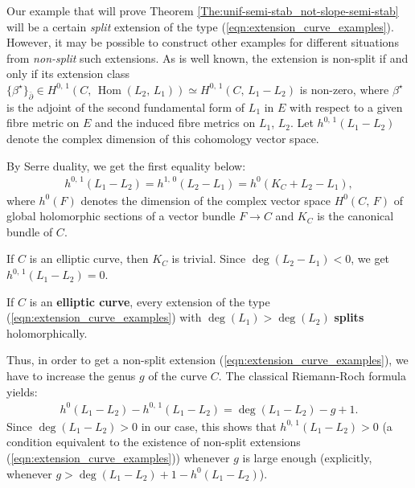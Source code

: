 \documentclass[12pt]{article}
\begin{document}
\vspace{2ex}

Our example that will prove Theorem \ref{The:unif-semi-stab_not-slope-semi-stab} will be a certain {\it split} extension of the type (\ref{eqn:extension_curve_examples}). However, it may be possible to construct other examples for different situations from {\it non-split} such extensions. As is well known, the extension is non-split if and only if its extension class $\{\beta^\star\}_{\bar\partial}\in H^{0,\,1}(C,\,\operatorname{Hom}(L_2,\,L_1))\simeq H^{0,\,1}(C,\, L_1-L_2)$ is non-zero, where $\beta^\star$ is the adjoint of the second fundamental form of $L_1$ in $E$ with respect to a given fibre metric on $E$ and the induced fibre metrics on $L_1$, $L_2$. Let $h^{0,\,1}(L_1-L_2)$ denote the complex dimension of this cohomology vector space.

By Serre duality, we get the first equality below: \begin{eqnarray*}h^{0,\,1}(L_1-L_2) = h^{1,\,0}(L_2-L_1) = h^0(K_C + L_2-L_1),\end{eqnarray*} where $h^0(F)$ denotes the dimension of the complex vector space $H^0(C,\,F)$ of global holomorphic sections of a vector bundle $F\to C$ and $K_C$ is the canonical bundle of $C$.

If $C$ is an elliptic curve, then $K_C$ is trivial. Since $\deg (L_2-L_1)<0$, we get $h^{0,\,1}(L_1-L_2) = 0$.

\begin{Conc}\label{Conc:elliptic-curve_solit-extension} If $C$ is an {\bf elliptic curve}, every extension of the type (\ref{eqn:extension_curve_examples}) with $\deg (L_1)> \deg (L_2)$ {\bf splits} holomorphically.


\end{Conc}


Thus, in order to get a non-split extension (\ref{eqn:extension_curve_examples}), we have to increase the genus $g$ of the curve $C$. The classical Riemann-Roch formula yields: \begin{eqnarray*}h^0(L_1-L_2) - h^{0,\,1}(L_1-L_2) = \deg (L_1-L_2) - g +1.\end{eqnarray*} Since $\deg (L_1-L_2) > 0$ in our case, this shows that $h^{0,\,1}(L_1-L_2) > 0$ (a condition equivalent to the existence of non-split extensions (\ref{eqn:extension_curve_examples})) whenever $g$ is large enough (explicitly, whenever $g > \deg (L_1-L_2) + 1 - h^0(L_1-L_2)$).


\vspace{2ex}
\end{document}
